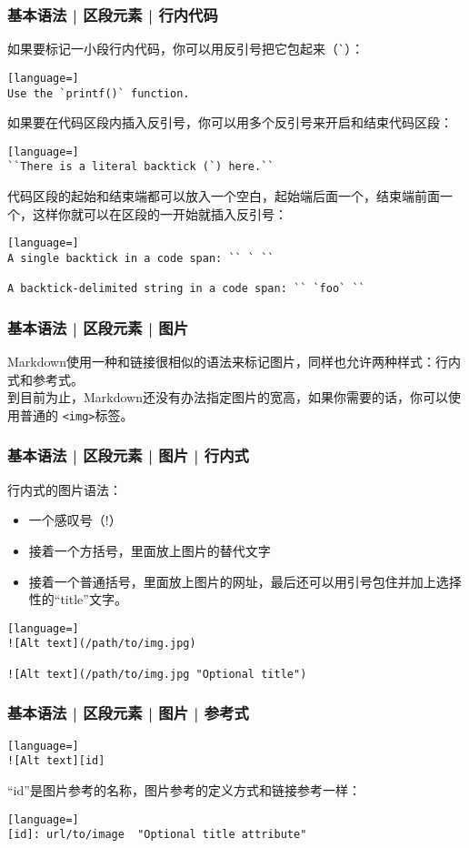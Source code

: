 \begin{frame}[fragile]
  \frametitle{基本语法 | 区段元素 | \alert{行内代码}}
  如果要标记一小段行内代码，你可以用反引号把它包起来（\verb|`|）：
\begin{lstlisting}[language=]
Use the `printf()` function.
\end{lstlisting}
\pause
如果要在代码区段内插入反引号，你可以用多个反引号来开启和结束代码区段：
\begin{lstlisting}[language=]
``There is a literal backtick (`) here.``
\end{lstlisting}
\pause
代码区段的起始和结束端都可以放入一个空白，起始端后面一个，结束端前面一个，这样你就可以在区段的一开始就插入反引号：
\begin{lstlisting}[language=]
A single backtick in a code span: `` ` ``
  
A backtick-delimited string in a code span: `` `foo` ``
\end{lstlisting}
\end{frame}

\begin{frame}[fragile]
  \frametitle{基本语法 | 区段元素 | 图片}
  Markdown使用一种和链接很相似的语法来标记图片，同样也允许两种样式：行内式和参考式。\\
  \vspace{1em}
  到目前为止，Markdown还没有办法指定图片的宽高，如果你需要的话，你可以使用普通的 \verb|<img>|标签。
\end{frame}

\begin{frame}[fragile]
  \frametitle{基本语法 | 区段元素 | 图片 | \alert{行内式}}
  行内式的图片语法：
  \begin{itemize}
    \item 一个感叹号（!）
    \item 接着一个方括号，里面放上图片的替代文字
    \item 接着一个普通括号，里面放上图片的网址，最后还可以用引号包住并加上选择性的“title”文字。
  \end{itemize}
\begin{lstlisting}[language=]
![Alt text](/path/to/img.jpg)

![Alt text](/path/to/img.jpg "Optional title")
\end{lstlisting}
\end{frame}

\begin{frame}[fragile]
  \frametitle{基本语法 | 区段元素 | 图片 | \alert{参考式}}
\begin{lstlisting}[language=]
![Alt text][id]
\end{lstlisting}
“id”是图片参考的名称，图片参考的定义方式和链接参考一样：
\begin{lstlisting}[language=]
[id]: url/to/image  "Optional title attribute"
\end{lstlisting}
\end{frame}

